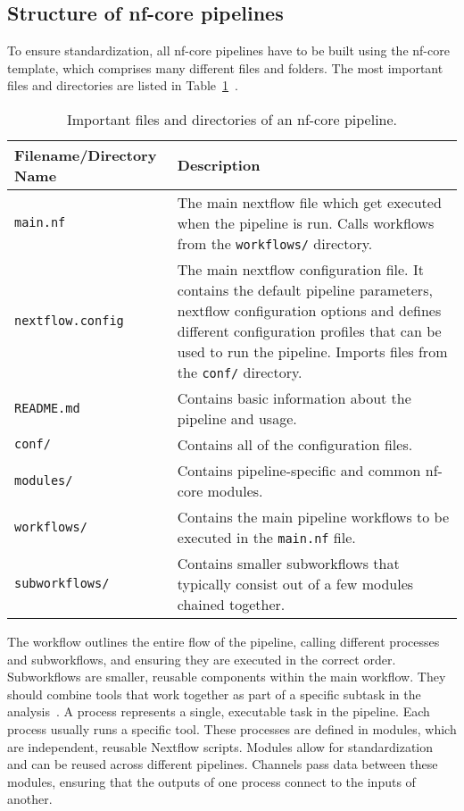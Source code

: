 \documentclass[12pt]{article}
\begin{document}
\subsection{Structure of nf-core pipelines}
To ensure standardization, all nf-core pipelines have to be built using the nf-core template, which comprises many different files and folders. The most important files and directories are listed in Table~\ref{nfcorefiles}~\cite{nfcorefs}.
\begin{table}[h]
    \centering
    \caption{Important files and directories of an nf-core pipeline.}
    \begin{tabular}{@{}lp{9cm}@{}}
        \toprule
        \textbf{Filename/Directory Name} & \textbf{Description} \\ \midrule
        \verb|main.nf| & The main nextflow file which get executed when the pipeline is run. Calls workflows from the \verb|workflows/| directory. \\
        \verb|nextflow.config| & The main nextflow configuration file. It contains the default pipeline parameters, nextflow configuration options and defines different configuration profiles that can be used to run the pipeline. Imports files from the \verb|conf/| directory. \\
        \verb|README.md| & Contains basic information about the pipeline and usage. \\
        \verb|conf/| & Contains all of the configuration files. \\
        \verb|modules/| & Contains pipeline-specific and common nf-core modules. \\
        \verb|workflows/| & Contains the main pipeline workflows to be executed in the \verb|main.nf| file. \\
        \verb|subworkflows/| & Contains smaller subworkflows that typically consist out of a few modules chained together. \\ \bottomrule
    \end{tabular}
    \label{nfcorefiles}
\end{table}

The workflow outlines the entire flow of the pipeline, calling different processes and subworkflows, and ensuring they are executed in the correct order.
Subworkflows are smaller, reusable components within the main workflow. They should combine tools that work together as part of a specific subtask in the analysis~\cite{nfcorefs}.
A process represents a single, executable task in the pipeline. Each process usually runs a specific tool. These processes are defined in modules, which are independent, reusable Nextflow scripts. Modules allow for standardization and can be reused across different pipelines.
Channels pass data between these modules, ensuring that the outputs of one process connect to the inputs of another.
\end{document}
